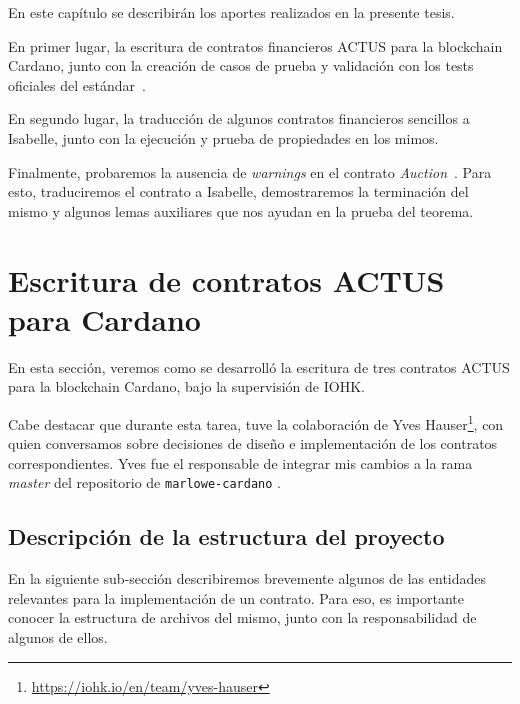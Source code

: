 \documentclass[12pt]{book}
\begin{document}
En este capítulo se describirán los aportes realizados en la presente tesis. 

En primer lugar, la escritura de contratos financieros ACTUS para la blockchain Cardano, junto con la creación de casos de prueba y validación con los tests oficiales del estándar~\cite{ACTUS_Tests}.

En segundo lugar, la traducción de algunos contratos financieros sencillos a Isabelle, junto con la ejecución y prueba de propiedades en los mimos.

Finalmente, probaremos la ausencia de \textit{warnings} en el contrato \textit{Auction}~\cite{auction_haskell}. Para esto, traduciremos el contrato a Isabelle, demostraremos la terminación del mismo y algunos lemas auxiliares que nos ayudan en la prueba del teorema.

\section{Escritura de contratos ACTUS para Cardano}

En esta sección, veremos como se desarrolló la escritura de tres contratos ACTUS para la blockchain Cardano, bajo la supervisión de IOHK.\@

Cabe destacar que durante esta tarea, tuve la colaboración de Yves Hauser\footnote{\url{https://iohk.io/en/team/yves-hauser}}, con quien conversamos sobre decisiones de diseño e implementación de los contratos correspondientes. Yves fue el responsable de integrar mis cambios a la rama \textit{master} del repositorio de \texttt{marlowe-cardano} \cite{marlowe-cardano-github}. %

\newpage
\subsection{Descripción de la estructura del proyecto}\label{ssec:estructura}

En la siguiente sub-sección describiremos brevemente algunos de las entidades relevantes para la implementación de un contrato. Para eso, es importante conocer la estructura de archivos del mismo, junto con la responsabilidad de algunos de ellos.
\end{document}
